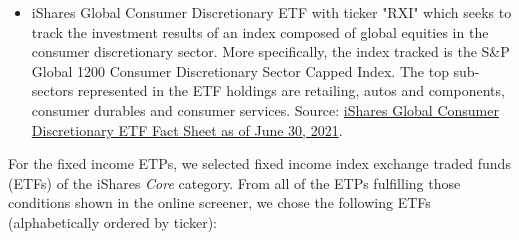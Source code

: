 \begin{itemize}
    \item iShares Global Consumer Discretionary ETF with ticker "RXI" which seeks to track the investment results of an index composed of global equities in the consumer discretionary sector. More specifically, the index tracked is the S{\&}P Global 1200 Consumer Discretionary Sector Capped Index. The top sub-sectors represented in the ETF holdings are retailing, autos and components, consumer durables and consumer services. Source: \href{https://www.ishares.com/us/literature/fact-sheet/rxi-ishares-global-consumer-discretionary-etf-fund-fact-sheet-en-us.pdf}{iShares Global Consumer Discretionary ETF Fact Sheet as of June 30, 2021}.%
\end{itemize}

For the fixed income ETPs, we selected fixed income index exchange traded funds (ETFs) of the iShares \textit{Core} category. From all of the ETPs fulfilling those conditions shown in the online screener, we chose the following ETFs (alphabetically ordered by ticker):

